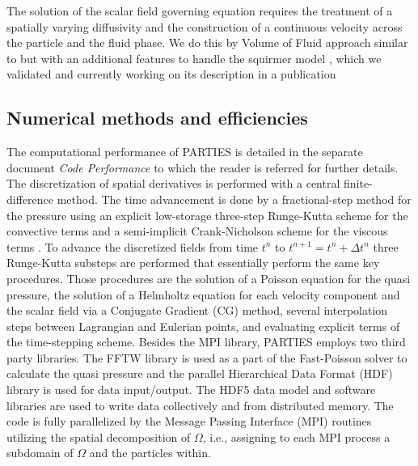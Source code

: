 \documentclass[10pt]{article}
\begin{document}
The solution of the scalar field governing equation requires the treatment of a  spatially varying diffusivity and the construction of a continuous velocity across the particle and the fluid phase. We do this by Volume of Fluid approach similar to \citep{ardekani2018heat} but with an additional features to handle the squirmer model \citep{chisholm2016},   which we validated and currently  working  on its description in a publication\cite{ouillon2019framework}



\subsection*{Numerical methods and efficiencies} 
The computational performance of PARTIES is detailed in the separate document \emph{Code Performance} to which the reader is referred for further details.
The discretization of spatial derivatives  is performed with a central finite-difference method. The time advancement is done by a fractional-step method for the pressure using an explicit low-storage three-step Runge-Kutta scheme for the convective terms and a semi-implicit Crank-Nicholson scheme for the viscous terms \citep{kempe2012}. To advance the discretized fields from time  $t^n$ to $t^{n+1}= t^{n}+\Delta t^n$ three Runge-Kutta substeps are performed that essentially perform the same key procedures. Those  procedures are the solution of a Poisson equation for the quasi pressure, the solution of a Helmholtz equation for each velocity component and the scalar field via a Conjugate Gradient (CG) method, several interpolation steps between Lagrangian and Eulerian points, and evaluating explicit terms of the time-stepping scheme. Besides the MPI library, PARTIES  employs two third party libraries. The FFTW library is used as a part of the  Fast-Poisson solver  to calculate the quasi pressure and the parallel Hierarchical Data Format (HDF) library is used for data input/output. The HDF5 data model and software libraries are used to write data collectively and from distributed memory. The code is fully parallelized by the Message Passing Interface (MPI) routines utilizing the spatial decomposition of $\Omega$, i.e., assigning to each MPI process a subdomain of $\Omega$ and the particles within.  
\end{document}
